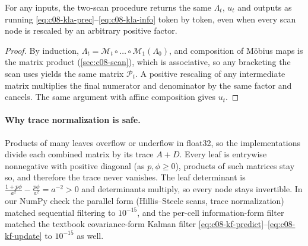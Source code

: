 \begin{proposition}\label{prop:c08-kla-par}
For any inputs, the two-scan procedure returns the same $\Lambda_t$, $u_t$ and outputs as running
\eqref{eq:c08-kla-prec}--\eqref{eq:c08-kla-info} token by token, even when every scan node is
rescaled by an arbitrary positive factor.
\end{proposition}
\begin{proof}
By induction, $\Lambda_t=\mathcal{M}_t\circ\dots\circ\mathcal{M}_1(\Lambda_0)$, and composition of
M\"obius maps is the matrix product (\cref{sec:c08-scan}), which is associative, so any bracketing
the scan uses yields the same matrix $\mathcal{P}_t$. A positive rescaling of any intermediate
matrix multiplies the final numerator and denominator by the same factor and cancels. The same
argument with affine composition gives $u_t$.
\end{proof}

\paragraph{Why trace normalization is safe.} Products of many leaves overflow or underflow in
float32, so the implementations divide each combined matrix by its trace $A+D$. Every leaf is
entrywise nonnegative with positive diagonal (as $p,\phi\ge0$), products of such matrices stay so,
and therefore the trace never vanishes. The leaf determinant is
$\frac{1+p\phi}{a^2}-\frac{p\phi}{a^2}=a^{-2}>0$ and determinants multiply, so every node stays
invertible. In our NumPy check the parallel form (Hillis--Steele scans, trace normalization)
matched sequential filtering to $10^{-15}$, and the per-cell information-form filter matched the
textbook covariance-form Kalman filter \eqref{eq:c08-kf-predict}--\eqref{eq:c08-kf-update} to
$10^{-15}$ as well.

